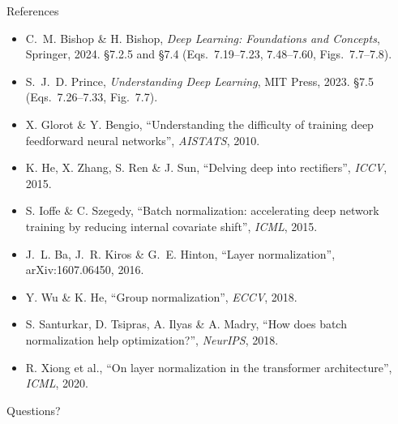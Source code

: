 \documentclass[aspectratio=169, 11pt]{beamer}
\newcommand{\nosrc}{}       %
\begin{document}
\begin{frame}{References}
  \nosrc
  \vspace{0.2em}
  {\scriptsize
  \begin{itemize}\itemsep0.26em
    \item C.~M. Bishop \& H. Bishop, \emph{Deep Learning: Foundations
          and Concepts}, Springer, 2024. \S7.2.5 and \S7.4
          (Eqs.~7.19--7.23, 7.48--7.60, Figs.~7.7--7.8).
    \item S.~J.~D. Prince, \emph{Understanding Deep Learning}, MIT
          Press, 2023. \S7.5 (Eqs.~7.26--7.33, Fig.~7.7).
    \item X. Glorot \& Y. Bengio, ``Understanding the difficulty of
          training deep feedforward neural networks'',
          \emph{AISTATS}, 2010.
    \item K. He, X. Zhang, S. Ren \& J. Sun, ``Delving deep into
          rectifiers'', \emph{ICCV}, 2015.
    \item S. Ioffe \& C. Szegedy, ``Batch normalization: accelerating
          deep network training by reducing internal covariate shift'',
          \emph{ICML}, 2015.
    \item J.~L. Ba, J.~R. Kiros \& G.~E. Hinton, ``Layer
          normalization'', arXiv:1607.06450, 2016.
    \item Y. Wu \& K. He, ``Group normalization'', \emph{ECCV}, 2018.
    \item S. Santurkar, D. Tsipras, A. Ilyas \& A. Madry, ``How does
          batch normalization help optimization?'',
          \emph{NeurIPS}, 2018.
    \item R. Xiong et al., ``On layer normalization in the transformer
          architecture'', \emph{ICML}, 2020.
  \end{itemize}}
\end{frame}

\begin{frame}[standout]
  \nosrc
  Questions?
\end{frame}
\end{document}
